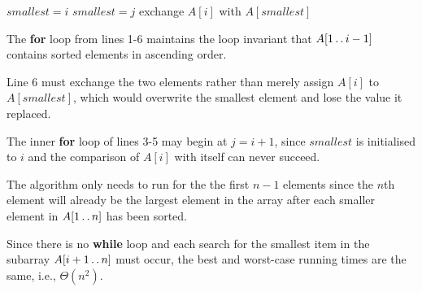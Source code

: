 \begin{algorithmic}[1]
  \STATE $\mathit{smallest} = i$
  \STATE $\mathit{smallest} = j$
  \ENDIF
  \ENDFOR
  \STATE exchange $A[i]$ with $A[\mathit{smallest}]$
  \ENDFOR
\end{algorithmic}

The \textbf{for} loop from lines 1-6 maintains the loop invariant
that $A[1\mathinner{{\ldotp}\,{\ldotp}} i-1]$
contains sorted elements in ascending order.

Line 6 must exchange the two elements rather than merely assign $A[i]$ to
$A[\mathit{smallest}]$, which would overwrite the smallest element and lose the
value it replaced.

The inner \textbf{for} loop of lines 3-5 may begin at $j = i + 1$, since
$\mathit{smallest}$ is initialised to $i$ and the comparison of $A[i]$ with
itself can never succeed.

The algorithm only needs to run for the the first $n - 1$ elements
since the $n$th
element will already be the largest element in the array after each
smaller element
in $A[1\mathinner{{\ldotp}\,{\ldotp}} n]$ has been sorted.

Since there is no \textbf{while} loop and each search for the
smallest item in the subarray
$A[i + 1\mathinner{{\ldotp}\,{\ldotp}} n]$ must occur, the best and worst-case running
times are the same,
i.e., $\Theta(n^2)$.

